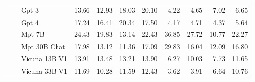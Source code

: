 \begin{table}
\begin{tabular}{l|l|l|rrrr|rrrr}
 &  & Gpt 3 & {\cellcolor[HTML]{FDDEDB}} \color[HTML]{000000} 13.66 & {\cellcolor[HTML]{FDE1DE}} \color[HTML]{000000} 12.93 & {\cellcolor[HTML]{FCCECA}} \color[HTML]{000000} 18.03 & {\cellcolor[HTML]{FCC6C2}} \color[HTML]{000000} 20.10 & {\cellcolor[HTML]{F6FCFD}} \color[HTML]{000000} 4.22 & {\cellcolor[HTML]{F5FBFD}} \color[HTML]{000000} 4.65 & {\cellcolor[HTML]{F1FAFC}} \color[HTML]{000000} 7.02 & {\cellcolor[HTML]{F2FAFC}} \color[HTML]{000000} 6.65 \\
 &  & Gpt 4 & {\cellcolor[HTML]{FCD1CD}} \color[HTML]{000000} 17.24 & {\cellcolor[HTML]{FDD4D0}} \color[HTML]{000000} 16.41 & {\cellcolor[HTML]{FCC6C1}} \color[HTML]{000000} 20.34 & {\cellcolor[HTML]{FCD0CC}} \color[HTML]{000000} 17.50 & {\cellcolor[HTML]{F6FCFD}} \color[HTML]{000000} 4.17 & {\cellcolor[HTML]{F5FBFD}} \color[HTML]{000000} 4.71 & {\cellcolor[HTML]{F6FCFD}} \color[HTML]{000000} 4.37 & {\cellcolor[HTML]{F4FBFC}} \color[HTML]{000000} 5.64 \\
 &  & Mpt 7B & {\cellcolor[HTML]{FBB0BA}} \color[HTML]{000000} 24.43 & {\cellcolor[HTML]{FCC7C3}} \color[HTML]{000000} 19.83 & {\cellcolor[HTML]{FDE1DE}} \color[HTML]{000000} 13.14 & {\cellcolor[HTML]{FBBABD}} \color[HTML]{000000} 22.43 & {\cellcolor[HTML]{8DD3C0}} \color[HTML]{000000} 36.85 & {\cellcolor[HTML]{BAE5DC}} \color[HTML]{000000} 27.72 & {\cellcolor[HTML]{EBF7FA}} \color[HTML]{000000} 10.77 & {\cellcolor[HTML]{D1EEE9}} \color[HTML]{000000} 22.27 \\
 &  & Mpt 30B Chat & {\cellcolor[HTML]{FCCECA}} \color[HTML]{000000} 17.98 & {\cellcolor[HTML]{FDE1DE}} \color[HTML]{000000} 13.12 & {\cellcolor[HTML]{FDE6E2}} \color[HTML]{000000} 11.36 & {\cellcolor[HTML]{FCD1CD}} \color[HTML]{000000} 17.09 & {\cellcolor[HTML]{B0E1D6}} \color[HTML]{000000} 29.83 & {\cellcolor[HTML]{E0F3F5}} \color[HTML]{000000} 16.04 & {\cellcolor[HTML]{E8F6FA}} \color[HTML]{000000} 12.09 & {\cellcolor[HTML]{DEF2F4}} \color[HTML]{000000} 16.80 \\
 &  & Vicuna 13B V1 & {\cellcolor[HTML]{FDDDDA}} \color[HTML]{000000} 13.91 & {\cellcolor[HTML]{FDDFDC}} \color[HTML]{000000} 13.48 & {\cellcolor[HTML]{FDE0DD}} \color[HTML]{000000} 13.21 & {\cellcolor[HTML]{FDDDDA}} \color[HTML]{000000} 13.90 & {\cellcolor[HTML]{F2FAFC}} \color[HTML]{000000} 6.27 & {\cellcolor[HTML]{ECF8FA}} \color[HTML]{000000} 10.03 & {\cellcolor[HTML]{F0F9FB}} \color[HTML]{000000} 7.73 & {\cellcolor[HTML]{E9F7FA}} \color[HTML]{000000} 11.65 \\
 &  & Vicuna 33B V1 & {\cellcolor[HTML]{FDE5E2}} \color[HTML]{000000} 11.69 & {\cellcolor[HTML]{FEE9E6}} \color[HTML]{000000} 10.28 & {\cellcolor[HTML]{FDE5E2}} \color[HTML]{000000} 11.59 & {\cellcolor[HTML]{FDE3E0}} \color[HTML]{000000} 12.43 & {\cellcolor[HTML]{F7FCFD}} \color[HTML]{000000} 3.62 & {\cellcolor[HTML]{F7FCFD}} \color[HTML]{000000} 3.91 & {\cellcolor[HTML]{F2FAFC}} \color[HTML]{000000} 6.64 & {\cellcolor[HTML]{EBF7FA}} \color[HTML]{000000} 10.76 \\

\end{tabular}
\end{table}
